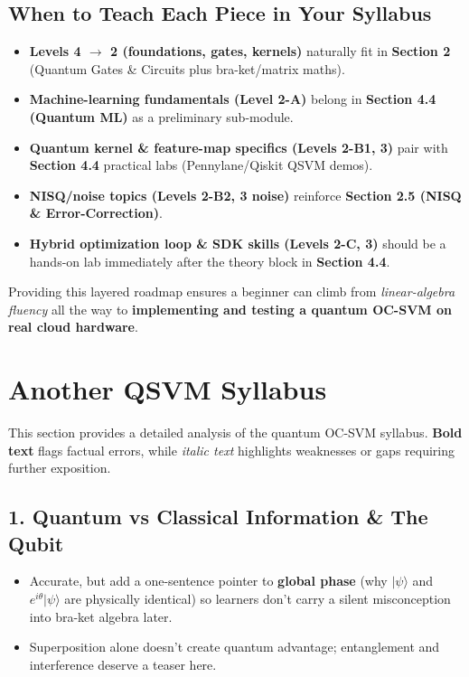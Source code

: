 \documentclass[11pt,a4paper]{article}
\begin{document}
	\subsection{When to Teach Each Piece in Your Syllabus}
	\begin{itemize}
		\item \textbf{Levels 4 $\rightarrow$ 2 (foundations, gates, kernels)} naturally fit in \textbf{Section 2} (Quantum Gates \& Circuits plus bra-ket/matrix maths).
		\item \textbf{Machine-learning fundamentals (Level 2-A)} belong in \textbf{Section 4.4 (Quantum ML)} as a preliminary sub-module.
		\item \textbf{Quantum kernel \& feature-map specifics (Levels 2-B1, 3)} pair with \textbf{Section 4.4} practical labs (Pennylane/Qiskit QSVM demos).
		\item \textbf{NISQ/noise topics (Levels 2-B2, 3 noise)} reinforce \textbf{Section 2.5 (NISQ \& Error-Correction)}.
		\item \textbf{Hybrid optimization loop \& SDK skills (Levels 2-C, 3)} should be a hands-on lab immediately after the theory block in \textbf{Section 4.4}.
	\end{itemize}
	
	Providing this layered roadmap ensures a beginner can climb from \emph{linear-algebra fluency} all the way to \textbf{implementing and testing a quantum OC-SVM on real cloud hardware}.

\section{Another QSVM Syllabus}


	This section provides a detailed analysis of the quantum OC-SVM syllabus. 
	\textbf{Bold text} flags factual errors, while \textit{italic text} highlights weaknesses or gaps requiring further exposition.
	
	\subsection{1. Quantum vs Classical Information \& The Qubit}
	\begin{itemize}
		\item Accurate, but add a one-sentence pointer to \textbf{global phase} (why $\lvert\psi\rangle$ and $e^{i\theta}\lvert\psi\rangle$ are physically identical) so learners don’t carry a silent misconception into bra-ket algebra later.
		\item Superposition alone doesn’t create quantum advantage; entanglement and interference deserve a teaser here.
	\end{itemize}
	
\end{document}
